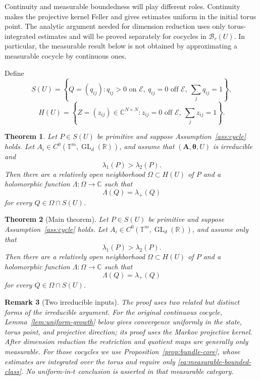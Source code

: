 \documentclass[11pt,a4paper]{amsart}
\newtheorem{theorem}{Theorem}[section]
\newtheorem{remark}[theorem]{Remark}
\newcommand{\T}{\mathbb T}
\newcommand{\R}{\mathbb R}
\newcommand{\C}{\mathbb C}
\newcommand{\cE}{\mathcal E}
\begin{document}
Continuity and measurable boundedness will play different roles.
Continuity makes the projective kernel Feller and gives estimates
uniform in the initial torus point.  The analytic argument needed for
dimension reduction uses only torus-integrated estimates and will be
proved separately for cocycles in \(\mathcal B_r(U)\).  In particular,
the measurable result below is not obtained by approximating a
measurable cocycle by continuous ones.

Define
\[
 S(U)=\left\{Q=(q_{ij}):
 q_{ij}>0\text{ on }\cE,\ q_{ij}=0\text{ off }\cE,\
 \sum_jq_{ij}=1\right\},
\]
\[
 H(U)=\left\{Z=(z_{ij})\in\C^{N\times N}:
 z_{ij}=0\text{ off }\cE,\ \sum_jz_{ij}=1\right\}.
\]

\begin{theorem}\label{thm:irreducible-core}
Let \(P\in S(U)\) be primitive and suppose
Assumption~\ref{ass:cycle} holds.  Let
\(A_i\in C^0(\T^m,\operatorname{GL}_d(\R))\), and assume that
\((\mathbf A,\boldsymbol\theta,U)\) is irreducible and
\[
 \lambda_1(P)>\lambda_2(P).
\]
Then there are a relatively open neighborhood
\(\Omega\subset H(U)\) of \(P\) and a holomorphic function
\(\Lambda:\Omega\to\C\) such that
\[
 \Lambda(Q)=\lambda_+(Q)
\]
for every \(Q\in\Omega\cap S(U)\).
\end{theorem}

\begin{theorem}[Main theorem]\label{thm:main}
Let \(P\in S(U)\) be primitive and suppose
Assumption~\ref{ass:cycle} holds.  Let
\(A_i\in C^0(\T^m,\operatorname{GL}_d(\R))\), and assume only that
\[
 \lambda_1(P)>\lambda_2(P).
\]
Then there are a relatively open neighborhood
\(\Omega\subset H(U)\) of \(P\) and a holomorphic function
\(\Lambda:\Omega\to\C\) such that
\[
 \Lambda(Q)=\lambda_+(Q)
\]
for every \(Q\in\Omega\cap S(U)\).
\end{theorem}

\begin{remark}[Two irreducible inputs]\label{rem:two-cores}
The proof uses two related but distinct forms of the irreducible
argument.  For the original continuous cocycle,
Lemma~\ref{lem:uniform-growth} below gives convergence uniformly in
the state, torus point, and projective direction; its proof uses the
Markov projective kernel.  After dimension reduction the restriction
and quotient maps are generally only measurable.  For those cocycles
we use Proposition~\ref{prop:bundle-core}, whose estimates are
integrated over the torus and require only
\eqref{eq:measurable-bounded-class}.  No uniform-in-\(t\) conclusion
is asserted in that measurable category.
\end{remark}
\end{document}

